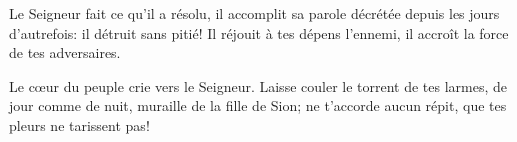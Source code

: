 Le Seigneur fait ce qu’il a résolu, il accomplit sa parole décrétée depuis les jours d’autrefois: il détruit sans pitié! Il réjouit à tes dépens l’ennemi, il accroît la force de tes adversaires.

Le cœur du peuple crie vers le Seigneur. Laisse couler le torrent de tes larmes, de jour comme de nuit, muraille de la fille de Sion; ne t’accorde aucun répit, que tes pleurs ne tarissent pas!